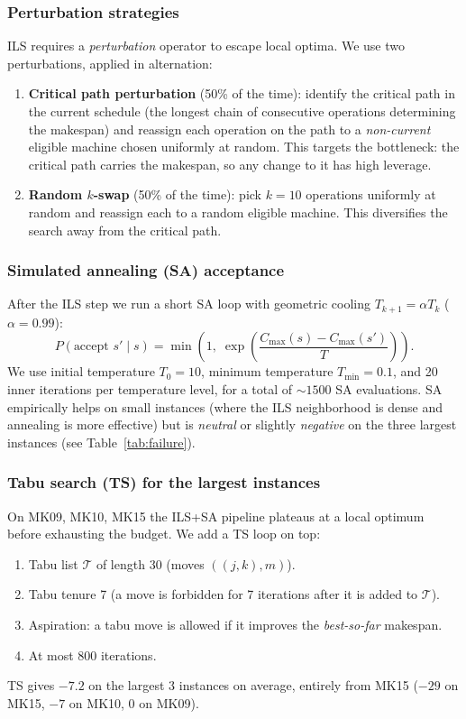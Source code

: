 \documentclass[10pt]{article}
\theoremstyle{definition}
\begin{document}
\subsubsection{Perturbation strategies}
ILS requires a \emph{perturbation} operator to escape local
optima. We use two perturbations, applied in alternation:
\begin{enumerate}
  \item \textbf{Critical path perturbation} (50\% of the
        time): identify the critical path in the current
        schedule (the longest chain of consecutive
        operations determining the makespan) and reassign
        each operation on the path to a \emph{non-current}
        eligible machine chosen uniformly at random. This
        targets the bottleneck: the critical path carries
        the makespan, so any change to it has high leverage.
  \item \textbf{Random $k$-swap} (50\% of the time):
        pick $k = 10$ operations uniformly at random and
        reassign each to a random eligible machine. This
        diversifies the search away from the critical
        path.
\end{enumerate}

\subsubsection{Simulated annealing (SA) acceptance}
After the ILS step we run a short SA loop with geometric
cooling $T_{k+1} = \alpha T_k$ ($\alpha = 0.99$):
\begin{equation}
  P(\text{accept } s' \mid s) = \min\!\left(1, \;
  \exp\!\left(\frac{C_{\max}(s) - C_{\max}(s')}{T}\right)\right).
  \label{eq:sa}
\end{equation}
We use initial temperature $T_0 = 10$, minimum temperature
$T_{\min} = 0.1$, and 20 inner iterations per temperature
level, for a total of $\sim\!1500$ SA evaluations. SA
empirically helps on small instances (where the ILS
neighborhood is dense and annealing is more effective)
but is \emph{neutral} or slightly \emph{negative} on
the three largest instances (see
Table~\ref{tab:failure}).

\subsubsection{Tabu search (TS) for the largest instances}
On MK09, MK10, MK15 the ILS+SA pipeline plateaus at a
local optimum before exhausting the budget. We add a TS
loop on top:
\begin{enumerate}
  \item Tabu list $\mathcal{T}$ of length 30 (moves
        $((j, k), m)$).
  \item Tabu tenure 7 (a move is forbidden for 7
        iterations after it is added to $\mathcal{T}$).
  \item Aspiration: a tabu move is allowed if it
        improves the \emph{best-so-far} makespan.
  \item At most 800 iterations.
\end{enumerate}
TS gives $-7.2$ on the largest 3 instances on average,
entirely from MK15 ($-29$ on MK15, $-7$ on MK10, $0$
on MK09).
\end{document}
